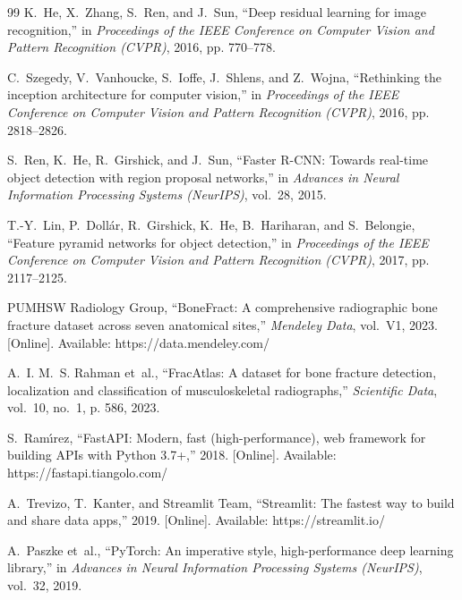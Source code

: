 \documentclass[12pt, a4paper]{report}
\begin{document}
\newpage
\begin{thebibliography}{99}
K.~He, X.~Zhang, S.~Ren, and J.~Sun, ``Deep residual learning for image recognition,'' in \emph{Proceedings of the IEEE Conference on Computer Vision and Pattern Recognition (CVPR)}, 2016, pp. 770--778.

C.~Szegedy, V.~Vanhoucke, S.~Ioffe, J.~Shlens, and Z.~Wojna, ``Rethinking the inception architecture for computer vision,'' in \emph{Proceedings of the IEEE Conference on Computer Vision and Pattern Recognition (CVPR)}, 2016, pp. 2818--2826.

S.~Ren, K.~He, R.~Girshick, and J.~Sun, ``Faster R-CNN: Towards real-time object detection with region proposal networks,'' in \emph{Advances in Neural Information Processing Systems (NeurIPS)}, vol.~28, 2015.

T.-Y.~Lin, P.~Doll{\'a}r, R.~Girshick, K.~He, B.~Hariharan, and S.~Belongie, ``Feature pyramid networks for object detection,'' in \emph{Proceedings of the IEEE Conference on Computer Vision and Pattern Recognition (CVPR)}, 2017, pp. 2117--2125.

PUMHSW Radiology Group, ``BoneFract: A comprehensive radiographic bone fracture dataset across seven anatomical sites,'' \emph{Mendeley Data}, vol.~V1, 2023. [Online]. Available: https://data.mendeley.com/

A.~I. M.~S. Rahman et~al., ``FracAtlas: A dataset for bone fracture detection, localization and classification of musculoskeletal radiographs,'' \emph{Scientific Data}, vol.~10, no.~1, p. 586, 2023.

S.~Ram{\'\i}rez, ``FastAPI: Modern, fast (high-performance), web framework for building APIs with Python 3.7+,'' 2018. [Online]. Available: https://fastapi.tiangolo.com/

A.~Trevizo, T.~Kanter, and Streamlit Team, ``Streamlit: The fastest way to build and share data apps,'' 2019. [Online]. Available: https://streamlit.io/

A.~Paszke et~al., ``PyTorch: An imperative style, high-performance deep learning library,'' in \emph{Advances in Neural Information Processing Systems (NeurIPS)}, vol.~32, 2019.


\end{thebibliography}
\end{document}
